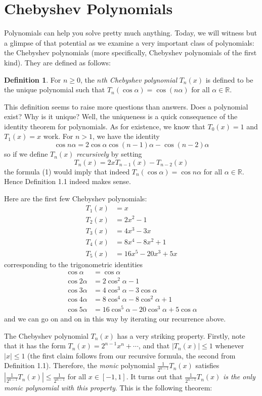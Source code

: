 \documentclass{article}
\theoremstyle{definition}
\newtheorem{definition}{Definition}[section]
\theoremstyle{remark}
\newcommand{\RR}{\mathbb{R}}
\newcommand{\geqs}{\geqslant}
\newcommand{\leqs}{\leqslant}
\begin{document}
\section{Chebyshev Polynomials}
Polynomials can help you solve pretty much anything. Today, we will witness but a glimpse of that potential as we examine a very important class of polynomials: the Chebyshev polynomials (more specifically, Chebyshev polynomials of the first kind). They are defined as follows:
\begin{definition}
For $n\geqs 0$, the \emph{$n$th Chebyshev polynomial} $T_n(x)$ is defined to be the unique polynomial such that $T_n(\cos\alpha)=\cos(n\alpha)$ for all $\alpha\in \RR$.
\end{definition}
This definition seems to raise more questions than answers. Does a polynomial exist? Why is it unique? Well, the uniqueness is a quick consequence of the identity theorem for polynomials. As for existence, we know that $T_0(x)=1$ and $T_1(x)=x$ work. For $n > 1$, we have the identity
\begin{equation}\cos n\alpha = 2\cos\alpha\cos{(n-1)\alpha} -\cos(n-2)\alpha\end{equation} so if we define $T_n(x)$ \emph{recursively} by setting 
\[T_n(x)=2x T_{n-1}(x)-T_{n-2}(x)\] the formula (1) would imply that indeed $T_n(\cos\alpha)=\cos n\alpha$ for all $\alpha \in \RR$. Hence Definition 1.1 indeed makes sense.

Here are the first few Chebyshev polynomials:
\begin{align*}
    T_1(x)&=x\\
    T_2(x)&=2x^2-1 \\
    T_3(x)&= 4x^3-3x \\
    T_4(x)&= 8x^4-8x^2+1 \\
    T_5(x) &= 16x^5-20x^3+5x 
\end{align*}
corresponding to the trigonometric identities
\begin{align*}
    \cos\alpha &= \cos\alpha \\
    \cos 2\alpha &= 2\cos^2\alpha - 1 \\
    \cos 3\alpha &= 4\cos^3\alpha - 3\cos\alpha \\
    \cos 4\alpha &= 8\cos^4\alpha - 8\cos^2\alpha + 1 \\
    \cos 5\alpha &= 16\cos^5\alpha-20\cos^3\alpha+5\cos\alpha
\end{align*}
and we can go on and on in this way by iterating our recurrence above.

The Chebyshev polynomial $T_n(x)$ has a very striking property. Firstly, note that it has the form $T_n(x)=2^{n-1}x^n+\cdots$, and that $|T_n(x)|\leqs 1$ whenever $|x|\leqs 1$ (the first claim follows from our recursive formula, the second from Definition 1.1). Therefore, the \emph{monic} polynomial $\frac{1}{2^{n-1}}T_n(x)$ satisfies $|\frac{1}{2^{n-1}}T_n(x)|\leqs \frac{1}{2^{n-1}}$ for all $x\in [-1,1]$. It turns out that $\frac{1}{2^{n-1}}T_n(x)$ \emph{is the only monic polynomial with this property}. This is the following theorem:
\end{document}
